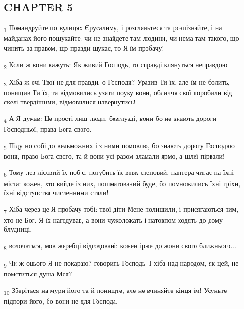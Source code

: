 \subsection{CHAPTER 5}
\begin{tcolorbox}
\textsubscript{1} Помандруйте по вулицях Єрусалиму, і розгляньтеся та розпізнайте, і на майданах його пошукайте: чи не знайдете там людини, чи нема там такого, що чинить за правом, що правди шукає, то Я їм пробачу!
\end{tcolorbox}
\begin{tcolorbox}
\textsubscript{2} Коли ж вони кажуть: Як живий Господь, то справді клянуться неправдою.
\end{tcolorbox}
\begin{tcolorbox}
\textsubscript{3} Хіба ж очі Твої не для правди, о Господи? Уразив Ти їх, але їм не болить, понищив Ти їх, та відмовились узяти поуку вони, обличчя свої поробили від скелі твердішими, відмовилися навернутись!
\end{tcolorbox}
\begin{tcolorbox}
\textsubscript{4} А Я думав: Це прості лиш люди, безглузді, вони бо не знають дороги Господньої, права Бога свого.
\end{tcolorbox}
\begin{tcolorbox}
\textsubscript{5} Піду но собі до вельможних і з ними помовлю, бо знають дорогу Господню вони, право Бога свого, та й вони усі разом зламали ярмо, а шлеї пірвали!
\end{tcolorbox}
\begin{tcolorbox}
\textsubscript{6} Тому лев лісовий їх поб'є, погубить їх вовк степовий, пантера чигає на їхні міста: кожен, хто вийде із них, пошматований буде, бо помножились їхні гріхи, їхні відступства численними стали!
\end{tcolorbox}
\begin{tcolorbox}
\textsubscript{7} Хіба через це Я пробачу тобі: твої діти Мене полишили, і присягаються тим, хто не Бог. Я їх нагодував, а вони чужоложать і натовпом ходять до дому блудниці,
\end{tcolorbox}
\begin{tcolorbox}
\textsubscript{8} волочаться, мов жеребці відгодовані: кожен ірже до жони свого ближнього...
\end{tcolorbox}
\begin{tcolorbox}
\textsubscript{9} Чи ж оцього Я не покараю? говорить Господь. І хіба над народом, як цей, не помститься душа Моя?
\end{tcolorbox}
\begin{tcolorbox}
\textsubscript{10} Зберіться на мури його та й понищте, але не вчиняйте кінця їм! Усуньте підпори його, бо вони не для Господа,
\end{tcolorbox}
